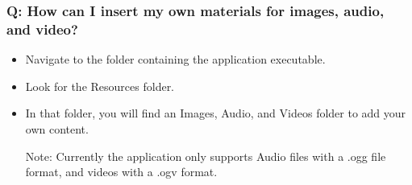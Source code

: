 \documentclass{article}
\begin{document}
		\subsubsection{Q: How can I insert my own materials for images, audio, and video?}

			\begin{itemize}

				\item Navigate to the folder containing the application executable.

				\item Look for the Resources folder.

				\item In that folder, you will find an Images, Audio, and Videos folder to add your own content.

				Note: Currently the application only supports Audio files with a .ogg file format, and videos with a .ogv format.

			\end{itemize}
\end{document}
